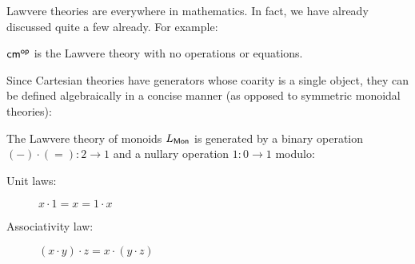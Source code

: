 Lawvere theories are everywhere in mathematics.  In fact, we have already discussed quite a few already.  For example:

\begin{example}
${\sf cm}^{\mathsf{op}}$ is the Lawvere theory with no operations or equations.
\end{example}

Since Cartesian theories have generators whose coarity is a single object, they can be defined algebraically in a concise manner (as opposed to symmetric monoidal theories):

\begin{example}
The Lawvere theory of monoids $L_{\sf Mon}$ is generated by a binary operation $(-)\cdot (=):2\to 1$ and a nullary operation $1:0\to 1$ modulo:


\begin{description}
\item[Unit laws:] $x\cdot 1 = x = 1\cdot x$
\item[Associativity law:] $(x\cdot y)\cdot z= x\cdot (y\cdot z)$
\end{description}
\end{example}

